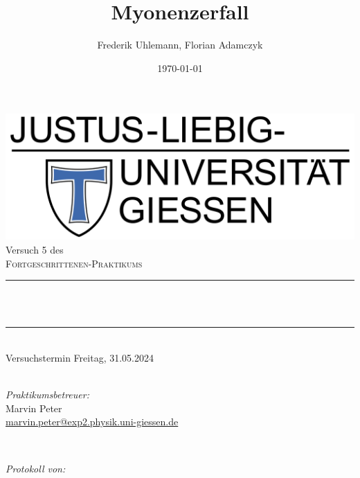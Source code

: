 \documentclass[12pt,a4paper,ngerman]{report}
\title{Myonenzerfall}			%
\author{Frederik Uhlemann, Florian Adamczyk}
\date{\today}
\makeatletter
\let\thetitle\@title
\makeatother
\begin{document}
		
	
	\begin{titlepage}
		\centering
		\vspace*{0.5 cm}
		\includegraphics[width = 0.6 \textwidth]{JLU_Giessen-Logo}	%
		\\[2.0 cm]
		Versuch 5 des\\
		\textsc{\Large  Fortgeschrittenen-Praktikums}\\ [0.3 cm]				%
		\rule{\linewidth}{0.2 mm} \\[0.4 cm]
		{ \huge \bfseries \thetitle}\\%
		\rule{\linewidth}{0.2 mm}\\
		Versuchstermin Freitag, 31.05.2024 \\
		~ \\
		[2.0 cm]
		
		
		\begin{minipage}{0.49\textwidth}
			\begin{flushleft}
				 \emph{Praktikumsbetreuer:}\\
				 Marvin Peter\\
				 \small{\href{mailto:marvin.peter@exp2.physik.uni-giessen.de}{marvin.peter@exp2.physik.uni-giessen.de}}
			\end{flushleft}
		\end{minipage}~
		\begin{minipage}{0.49\textwidth}
			\begin{flushright}
				\emph{Protokoll von:} \\
				

\end{flushright}
\end{minipage}
\end{titlepage}
\end{document}
